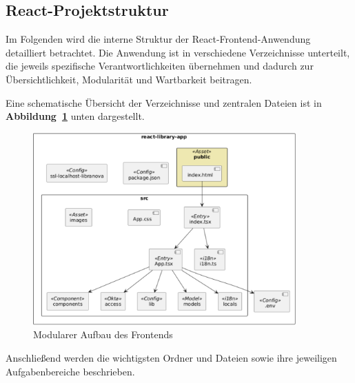 \subsection{React-Projektstruktur}

Im Folgenden wird die interne Struktur der React-Frontend-Anwendung detailliert betrachtet. Die Anwendung ist in verschiedene Verzeichnisse unterteilt, die jeweils spezifische Verantwortlichkeiten übernehmen und dadurch zur Übersichtlichkeit, Modularität und Wartbarkeit beitragen.

\noindent Eine schematische Übersicht der Verzeichnisse und zentralen Dateien ist in \textbf{Abbildung~\ref{fig:folder-structure}} unten dargestellt.

\begin{figure}[H]
	\centering
	\includegraphics[width=0.9\textwidth]{images/frontend_structure.png}
	\caption{Modularer Aufbau des Frontends}
	\label{fig:folder-structure}
\end{figure} 
\noindent Anschließend werden die wichtigsten Ordner und Dateien sowie ihre jeweiligen Aufgabenbereiche beschrieben.
